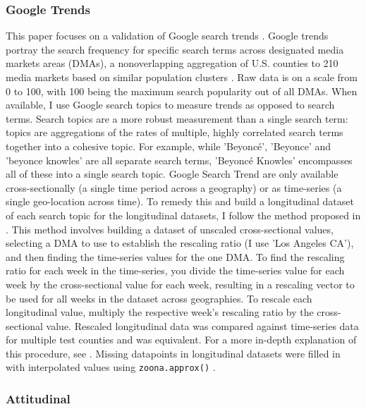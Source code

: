 \subsubsection{Google Trends}
This paper focuses on a validation of Google search trends \citep{googletrends}.
Google trends portray the search frequency for specific search terms across
designated media markets areas (DMAs), a nonoverlapping aggregation of U.S.
counties to 210 media markets based on similar population clusters \citep{dma_key}.
Raw data is on a scale from 0 to 100, with 100 being the maximum search
popularity out of all DMAs. When available, I use Google search topics to
measure trends as opposed to search terms. Search topics are a more robust
measurement than a single search term: topics are aggregations of the rates of
multiple, highly correlated search terms together into a cohesive topic. For
example, while 'Beyoncé', 'Beyonce' and 'beyonce knowles' are all separate
search terms, 'Beyoncé Knowles' encompasses all of these into a single search
topic. Google Search Trend are only available cross-sectionally (a single time
period across a geography) or as time-series (a single geo-location across
time). To remedy this and build a longitudinal dataset of each search topic for
the longitudinal datasets, I follow the method proposed in \citet[p. 5]{park_etal}.
This method involves building a dataset of unscaled cross-sectional values,
selecting a DMA to use to establish the rescaling ratio (I use 'Los Angeles
CA'), and then finding the time-series values for the one DMA. To find the
rescaling ratio for each week in the time-series, you divide the time-series
value for each week by the cross-sectional value for each week, resulting in a
rescaling vector to be used for all weeks in the dataset across geographies. To
rescale each longitudinal value, multiply the respective week's rescaling ratio
by the cross-sectional value. Rescaled longitudinal data was compared against
time-series data for multiple test counties and was equivalent. For a more
in-depth explanation of this procedure, see \citet[p. 5]{park_etal}. Missing
datapoints in longitudinal datasets were filled in with interpolated values
using \texttt{zoo\:\:na.approx()} \citep{zoo}.

\subsubsection{Attitudinal}


